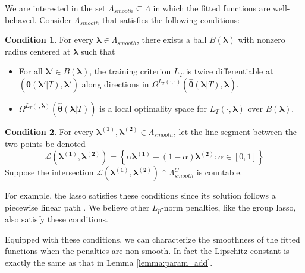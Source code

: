 \documentclass[12pt]{article} %
\theoremstyle{definition}
\newtheorem{condition}{Condition}
\begin{document}
We are interested in the set $\Lambda_{smooth} \subseteq \Lambda$ in which the fitted functions are well-behaved. Consider $\Lambda_{smooth}$ that satisfies the following conditions:

\begin{condition}
	\label{condn:nonsmooth1}
	For every $\boldsymbol{\lambda} \in \Lambda_{smooth}$, there exists a ball $B(\boldsymbol{\lambda})$ with nonzero radius centered at $\boldsymbol{\lambda}$ such that
	\begin{itemize}
		\item For all $\boldsymbol{\lambda}'\in B(\boldsymbol{\lambda})$, the training criterion $L_{T}$ is twice differentiable at $(\hat{\boldsymbol{\theta}}(\boldsymbol{\lambda}'|T), \boldsymbol{\lambda}')$
		along directions in $\Omega^{L_{T}(\cdot,\cdot)}\left(\hat{\boldsymbol{\theta}}(\boldsymbol{\lambda} | T), \boldsymbol{\lambda}\right)$.
		\item $\Omega^{L_T(\cdot, \boldsymbol{\lambda})} \left (\hat{\boldsymbol \theta}\left(\boldsymbol{\lambda}|T \right) \right)$ is a local optimality space for $L_T\left(\cdot,\boldsymbol{\lambda}\right)$ over $B(\boldsymbol{\lambda})$.
	\end{itemize}
\end{condition}
\begin{condition}
	\label{condn:nonsmooth2}
	For every $\boldsymbol{\lambda^{(1)}},\boldsymbol{\lambda^{(2)}}\in\Lambda_{smooth}$, let the line segment between the two points be denoted 
	$$
	\mathcal{L}(\boldsymbol{\lambda^{(1)}},\boldsymbol{\lambda^{(2)}})=\left\{ \alpha\boldsymbol{\lambda^{(1)}}+(1-\alpha)\boldsymbol{\lambda^{(2)}}:\alpha\in[0,1]\right\} 
	$$
	Suppose the intersection $\mathcal{L}(\boldsymbol{\lambda^{(1)}},\boldsymbol{\lambda^{(2)}})\cap\Lambda_{smooth}^{C}$
	is countable.
\end{condition}
For example, the lasso satisfies these conditions since its solution follows a piecewise linear path \citep{efron2004least, tibshirani2011solution}. We believe other $L_p$-norm penalties, like the group lasso, also satisfy these conditions.

Equipped with these conditions, we can characterize the smoothness of the fitted functions when the penalties are non-smooth. In fact the Lipschitz constant is exactly the same as that in Lemma \ref{lemma:param_add}.
\end{document}
